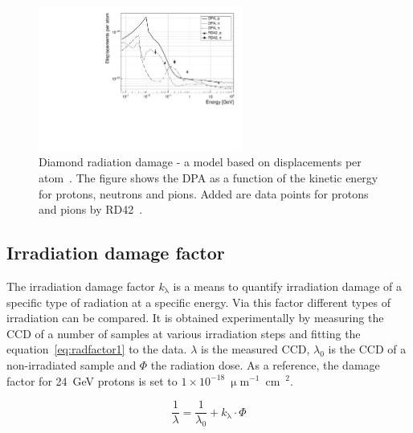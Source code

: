 \begin{figure}[!t]
\begin{center}
\includegraphics[width=0.6\textwidth]{03_measurement_results/scripts/plots/dpa1}
\caption{Diamond radiation damage - a model based on displacements per atom~\cite{Guthoff:2014223}. The figure shows the DPA as a function of the kinetic energy for protons, neutrons and pions. Added are data points for protons and pions by RD42~\cite{RD42IRRAD:00000}. %
}
\label{fig:kitdpa}
\end{center}
\end{figure}

\subsection{Irradiation damage factor}
\label{sec:irfac}
The irradiation damage factor $k_\uplambda$ is a means to quantify irradiation damage of a specific type of radiation at a specific energy. Via this factor different types of irradiation can be compared. It is obtained experimentally by measuring the CCD of a number of samples at various irradiation steps and fitting the equation~\ref{eq:radfactor1} to the data. $\lambda$ is the measured CCD, $\lambda_\mathrm{0}$ is the CCD of a non-irradiated sample and $\Phi$ the radiation dose. As a reference, the damage factor for 24~GeV protons is set to $1\times10^{-18}~\upmu$m$^{-1}$~cm~$^{2}$.


\begin{equation}
\label{eq:radfactor1}
\frac{1}{\lambda} = \frac{1}{\lambda_\mathrm{0}}+k_\uplambda\cdot\Phi
\end{equation} 





